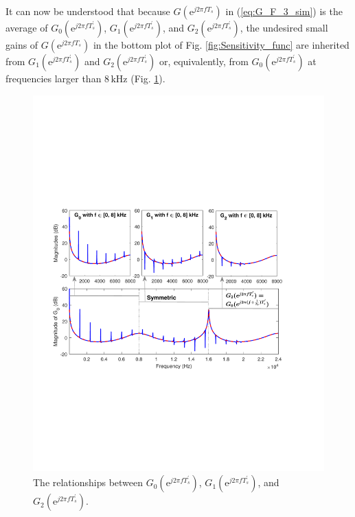 \documentclass [11pt, proquest] {uwthesis}[2020/02/24]
\begin{document}
It can now be understood that because $G(\text{e}^{j2\pi fT_{s}})$
in (\ref{eq:G_F_3_sim}) is the average of $G_{0}(\text{e}^{j2\pi fT_{s}^{'}})$,
$G_{1}(\text{e}^{j2\pi fT_{s}^{'}})$, and $G_{2}(\text{e}^{j2\pi fT_{s}^{'}})$,
the undesired small gains of $G(\text{e}^{j2\pi fT_{s}})$ in the
bottom plot of Fig. \ref{fig:Sensitivity_func} are inherited from
$G_{1}(\text{e}^{j2\pi fT_{s}^{'}})$ and $G_{2}(\text{e}^{j2\pi fT_{s}^{'}})$
or, equivalently, from $G_{0}(\text{e}^{j2\pi fT_{s}^{'}})$ at frequencies
larger than $8\,\text{kHz}$ (Fig. \ref{fig:The-relationship-between}).
\begin{figure}[!ht]
\begin{centering}
\includegraphics[width=15cm]{Fractional-order-RC/G_all}
\par\end{centering}
\caption{\label{fig:The-relationship-between}The relationships between $G_{0}(\text{e}^{j2\pi fT_{s}^{'}})$,
$G_{1}(\text{e}^{j2\pi fT_{s}^{'}})$, and $G_{2}(\text{e}^{j2\pi fT_{s}^{'}})$.}
\end{figure}
 
\end{document}

